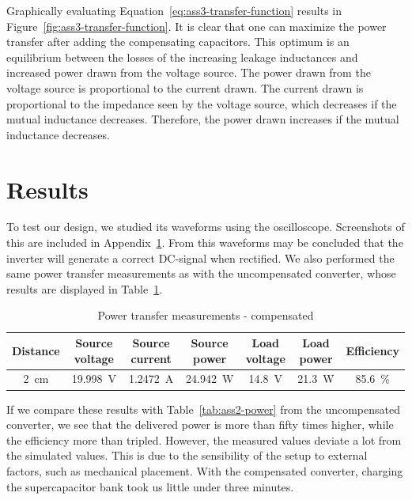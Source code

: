 \documentclass[11pt,titlepage]{report}
\begin{document}
Graphically evaluating Equation~\ref{eq:ass3-transfer-function} results in Figure~\ref{fig:ass3-transfer-function}. It is clear that one can maximize the power transfer after adding the compensating capacitors. This optimum is an equilibrium between the losses of the increasing leakage inductances and increased power drawn from the voltage source. The power drawn from the voltage source is proportional to the current drawn. The current drawn is proportional to the impedance seen by the voltage source, which decreases if the mutual inductance decreases. Therefore, the power drawn increases if the mutual inductance decreases.

\section{Results}
To test our design, we studied its waveforms using the oscilloscope. Screenshots of this are included in Appendix~\ref{}. 
From this waveforms may be concluded that the inverter will generate a correct DC-signal when rectified.
We also performed the same power transfer measurements as with the uncompensated converter, whose results are displayed in Table~\ref{tab:ass3-power}.

\begin{table}[H]
	\centering
	\caption{Power transfer measurements - compensated}
	\label{tab:ass3-power}
	\begin{tabular}{c c c c c c c}
		\hline\hline
		Distance & Source voltage & Source current & Source power & Load voltage & Load power & Efficiency \\
		\hline
		\SI{2}{cm} & \SI{19.998}{V} & \SI{1.2472}{A} & \SI{24.942}{W} & \SI{14.8}{V} & \SI{21.3}{W} & \SI{85.6}{\percent} \\
		\hline
		\end{tabular}
\end{table}

If we compare these results with Table~\ref{tab:ass2-power} from the uncompensated converter, we see that the delivered power is more than fifty times higher, while the efficiency more than tripled. However, the measured values deviate a lot from the simulated values. This is due to the sensibility of the setup to external factors, such as mechanical placement. With the compensated converter, charging the supercapacitor bank took us little under three minutes.
\end{document}
